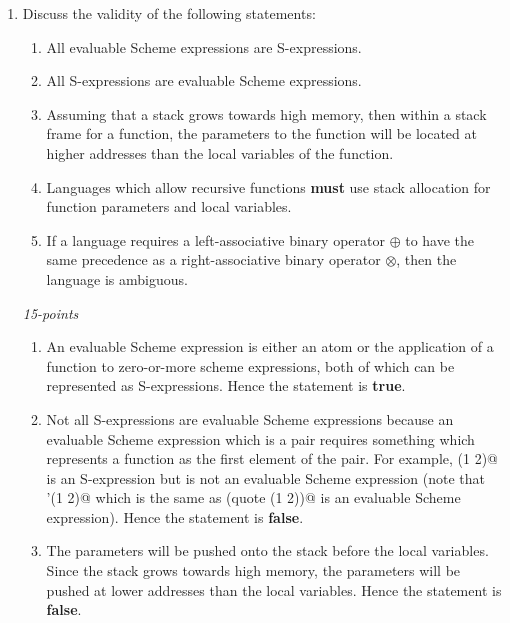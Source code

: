 \documentclass[12pt]{article}
\begin{document}
\begin{enumerate}
\item Discuss the validity of the following statements:

  \begin{enumerate}

  \item All evaluable Scheme expressions are S-expressions.

  \item All S-expressions are evaluable Scheme expressions.

  \item Assuming that a stack grows towards high memory, then within a
    stack frame for a function, the parameters to the function will be
    located at higher addresses than the local variables of the
    function.

  \item Languages which allow recursive functions \textbf{must} use
    stack allocation for function parameters and local variables.

  \item If a language requires a left-associative binary operator $\oplus$
    to have the same precedence as a right-associative binary operator
    $\otimes$, then the language is ambiguous.

    \end{enumerate}
\hfill\textit{15-points}

  \begin{enumerate}

  \item An evaluable Scheme expression is either an atom or the
    application of a function to zero-or-more scheme expressions, both
    of which can be represented as S-expressions.  Hence the statement
    is \textbf{true}.

  \item Not all S-expressions are evaluable Scheme expressions because
    an evaluable Scheme expression which is a pair requires something
    which represents a function as the first element of the pair.  For
    example, \verb@(1 2)@ is an S-expression but is not an evaluable Scheme
    expression (note that \verb@'(1 2)@ which is the same as
    \verb@(quote (1 2))@ is an evaluable Scheme expression).  Hence the
    statement is \textbf{false}.

  \item The parameters will be pushed onto the stack before the local
    variables.  Since the stack grows towards high memory, the
    parameters will be pushed at lower addresses than the local
    variables.  Hence the statement is \textbf{false}.



\end{enumerate}
\end{enumerate}
\end{document}
